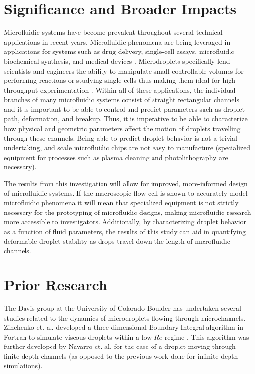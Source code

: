 \documentclass{article}
\begin{document}
\section{Significance and Broader Impacts}

Microfluidic systems have become prevalent throughout several technical applications in recent years. Microfluidic phenomena are being leveraged in applications for systems such as drug delivery, single-cell assays, microfluidic biochemical synthesis, and medical devices \cite{theberge_microdroplets_2010}. Microdroplets specifically lend scientists and engineers the ability to manipulate small controllable volumes for performing reactions or studying single cells thus making them ideal for high-throughput experimentation \cite{sackmann_present_2014}. 
Within all of these applications, the individual branches of many microfluidic systems consist of straight rectangular channels and it is important to be able to control and predict parameters such as droplet path, deformation, and breakup. Thus, it is imperative to be able to characterize how physical and geometric parameters affect the motion of droplets travelling through these channels. Being able to predict droplet behavior is not a trivial undertaking, and scale microfluidic chips are not easy to manufacture (specialized equipment for processes such as plasma cleaning and photolithography are necessary). 

The results from this investigation will allow for improved, more-informed design of microfluidic systems. If the macroscopic flow cell is shown to accurately model microfluidic phenomena it will mean that specialized equipment is not strictly necessary for the prototyping of microfluidic designs, making microfluidic research more accessible to investigators. Additionally, by characterizing droplet behavior as a function of fluid parameters, the results of this study can aid in quantifying deformable droplet stability as drops travel down the length of microfluidic channels. 

\section{Prior Research}
The Davis group at the University of Colorado Boulder has undertaken several studies related to the dynamics of microdroplets flowing through microchannels. Zinchenko et. al. developed a three-dimensional Boundary-Integral algorithm in Fortran to simulate viscous droplets within a low $Re$ regime \cite{zinchenko_novel_1997}. This algorithm was further developed by Navarro et. al. \cite{rociophd_thesis} for the case of a droplet moving through finite-depth channels (as opposed to the previous work done for infinite-depth simulations). 
\end{document}
